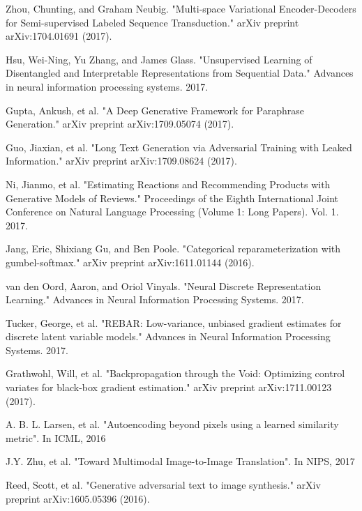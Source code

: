 \documentclass[a4paper]{article}
\begin{document}
\noindent [7] Zhou, Chunting, and Graham Neubig. "Multi-space Variational Encoder-Decoders for Semi-supervised Labeled Sequence Transduction." arXiv preprint arXiv:1704.01691 (2017).

\noindent [8] Hsu, Wei-Ning, Yu Zhang, and James Glass. "Unsupervised Learning of Disentangled and Interpretable Representations from Sequential Data." Advances in neural information processing systems. 2017.

\noindent [9] Gupta, Ankush, et al. "A Deep Generative Framework for Paraphrase Generation." arXiv preprint arXiv:1709.05074 (2017).

\noindent [10] Guo, Jiaxian, et al. "Long Text Generation via Adversarial Training with Leaked Information." arXiv preprint arXiv:1709.08624 (2017).

\noindent [11] Ni, Jianmo, et al. "Estimating Reactions and Recommending Products with Generative Models of Reviews." Proceedings of the Eighth International Joint Conference on Natural Language Processing (Volume 1: Long Papers). Vol. 1. 2017.

\noindent [12] Jang, Eric, Shixiang Gu, and Ben Poole. "Categorical reparameterization with gumbel-softmax." arXiv preprint arXiv:1611.01144 (2016).

\noindent [13] van den Oord, Aaron, and Oriol Vinyals. "Neural Discrete Representation Learning." Advances in Neural Information Processing Systems. 2017.

\noindent [14] Tucker, George, et al. "REBAR: Low-variance, unbiased gradient estimates for discrete latent variable models." Advances in Neural Information Processing Systems. 2017.

\noindent [15] Grathwohl, Will, et al. "Backpropagation through the Void: Optimizing control variates for black-box gradient estimation." arXiv preprint arXiv:1711.00123 (2017).

\noindent [16] A. B. L. Larsen, et al. "Autoencoding beyond pixels using a learned similarity metric". In ICML, 2016

\noindent [17] J.Y. Zhu, et al. "Toward Multimodal Image-to-Image Translation". In NIPS, 2017

\noindent [18] Reed, Scott, et al. "Generative adversarial text to image synthesis." arXiv preprint arXiv:1605.05396 (2016).
\end{document}
